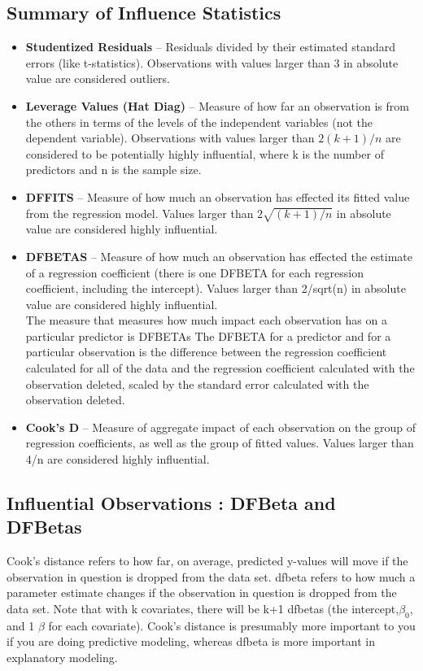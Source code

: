 \documentclass[12pt, a4paper]{article}
\theoremstyle{plain}
\theoremstyle{definition}
\theoremstyle{remark}
\begin{document}
\subsection{Summary of Influence Statistics}
\begin{itemize}
\item	\textbf{Studentized Residuals} – Residuals divided by their estimated standard errors (like t-statistics). Observations with values larger than 3 in absolute value are considered outliers.
\item	\textbf{Leverage Values (Hat Diag)} – Measure of how far an observation is from the others in terms of the levels of the independent variables (not the dependent variable). Observations with values larger than $2(k+1)/n$ are considered to be potentially highly influential, where k is the number of predictors and n is the sample size.
\item	\textbf{DFFITS} – Measure of how much an observation has effected its fitted value from the regression model. Values larger than $2\sqrt{(k+1)/n}$ in absolute value are considered highly influential. %
\item	\textbf{DFBETAS} – Measure of how much an observation has effected the estimate of a regression coefficient (there is one DFBETA for each regression coefficient, including the intercept). Values larger than 2/sqrt(n) in absolute value are considered highly influential.
\\
The measure that measures how much impact each observation has on a particular predictor is DFBETAs The DFBETA for a predictor and for a particular observation is the difference between the regression coefficient calculated for all of the data and the regression coefficient calculated with the observation deleted, scaled by the standard error calculated with the observation deleted. 

\item	\textbf{Cook’s D} – Measure of aggregate impact of each observation on the group of regression coefficients, as well as the group of fitted values. Values larger than 4/n are considered highly influential.
\end{itemize}


\subsection{Influential Observations : DFBeta and DFBetas}
Cook's distance refers to how far, on average, predicted y-values will move if the observation in question is dropped from the data set. dfbeta refers to how much a parameter estimate changes if the observation in question is dropped from the data set. Note that with k covariates, there will be k+1 dfbetas (the intercept,$\beta_0$, and 1 $\beta$ for each covariate). Cook's distance is presumably more important to you if you are doing predictive modeling, whereas dfbeta is more important in explanatory modeling.
\end{document}
